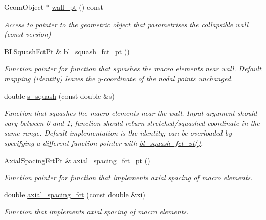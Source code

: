 \begin{DoxyCompactItemize}
Geom\+Object $\ast$ \hyperlink{classoomph_1_1CollapsibleChannelDomain_a48237d8c4d10ff3ccdf68d02da5b29c7}{wall\+\_\+pt} () const
\begin{DoxyCompactList}\small\item\em Access to pointer to the geometric object that parametrises the collapsible wall (const version) \end{DoxyCompactList}\item 
\hyperlink{classoomph_1_1CollapsibleChannelDomain_a2bf1d7943bfac134a5c27a54c7e1faed}{B\+L\+Squash\+Fct\+Pt} \& \hyperlink{classoomph_1_1CollapsibleChannelDomain_a9c7def97a2248a8e5a2dca79ee3a54eb}{bl\+\_\+squash\+\_\+fct\+\_\+pt} ()
\begin{DoxyCompactList}\small\item\em Function pointer for function that squashes the macro elements near wall. Default mapping (identity) leaves the y-\/coordinate of the nodal points unchanged. \end{DoxyCompactList}\item 
double \hyperlink{classoomph_1_1CollapsibleChannelDomain_a638fd3959b72ef3287615f2b0f968e33}{s\+\_\+squash} (const double \&s)
\begin{DoxyCompactList}\small\item\em Function that squashes the macro elements near the wall. Input argument should vary between 0 and 1; function should return stretched/squashed coordinate in the same range. Default implementation is the identity; can be overloaded by specifying a different function pointer with \hyperlink{classoomph_1_1CollapsibleChannelDomain_a9c7def97a2248a8e5a2dca79ee3a54eb}{bl\+\_\+squash\+\_\+fct\+\_\+pt()}. \end{DoxyCompactList}\item 
\hyperlink{classoomph_1_1CollapsibleChannelDomain_a317472dab112beac771ecf6442a465f5}{Axial\+Spacing\+Fct\+Pt} \& \hyperlink{classoomph_1_1CollapsibleChannelDomain_a17bfb9fe218dc539669bdbdf0ecc4bf8}{axial\+\_\+spacing\+\_\+fct\+\_\+pt} ()
\begin{DoxyCompactList}\small\item\em Function pointer for function that implements axial spacing of macro elements. \end{DoxyCompactList}\item 
double \hyperlink{classoomph_1_1CollapsibleChannelDomain_abc7b20efd68bdd11f1bea5df79ae579d}{axial\+\_\+spacing\+\_\+fct} (const double \&xi)
\begin{DoxyCompactList}\small\item\em Function that implements axial spacing of macro elements. \end{DoxyCompactList}\item 

\end{DoxyCompactItemize}
